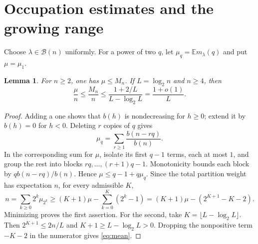 \documentclass[11pt]{article}
\newtheorem{lemma}[theorem]{Lemma}
\newcommand{\B}{\mathcal B}
\begin{document}
\section{Occupation estimates and the growing range}
Choose $\lambda\in\B(n)$ uniformly. For a power of two $q$, let
$\mu_q=\mathbb E m_\lambda(q)$ and put $\mu=\mu_1$.

\begin{lemma}\label{lem:mean}
For $n\ge2$, one has $\mu\le M_n$. If $L=\log_2n$ and $n\ge4$, then
\begin{equation}\label{eq:mean}
 \frac{\mu}{n}\le\frac{M_n}{n}
 \le\frac{1+2/L}{L-\log_2L}=\frac{1+o(1)}L.
\end{equation}
\end{lemma}
\begin{proof}
Adding a one shows that $b(h)$ is nondecreasing for $h\ge0$; extend it by
$b(h)=0$ for $h<0$. Deleting $r$ copies of $q$ gives
\[
 \mu_q=\sum_{r\ge1}\frac{b(n-rq)}{b(n)}.
\]
In the corresponding sum for $\mu$, isolate its first $q-1$ terms, each
at most $1$, and group the rest into blocks $rq,\ldots,(r+1)q-1$.
Monotonicity bounds each block by $qb(n-rq)/b(n)$. Hence
$\mu\le q-1+q\mu_q$.
Since the total partition weight has expectation $n$, for every admissible $K$,
\[
 n=\sum_{k\ge0}2^k\mu_{2^k}
 \ge (K+1)\mu-\sum_{k=0}^K(2^k-1)
 =(K+1)\mu-(2^{K+1}-K-2).
\]
Minimizing proves the first assertion.
For the second, take $K=\lfloor L-\log_2L\rfloor$.
Then $2^{K+1}\le2n/L$ and $K+1\ge L-\log_2L>0$.
Dropping the nonpositive term $-K-2$ in the numerator gives \eqref{eq:mean}.
\end{proof}
\end{document}
